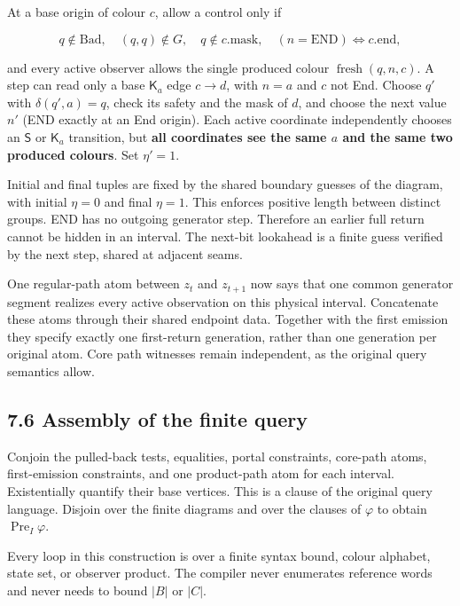 \documentclass[
  11pt,
  a4paper,
]{article}
\begin{document}
At a base origin of colour \(c\), allow a control only if

\[q\notin\mathrm{Bad},\quad(q,q)\notin G,\quad q\notin c.\mathrm{mask},
\quad(n=\mathrm{END})\Longleftrightarrow c.\mathrm{end},\]

and every active observer allows the single produced colour
\(\operatorname{fresh}(q,n,c)\). A step can read only a base
\(\mathsf K_a\) edge \(c\to d\), with \(n=a\) and \(c\) not End. Choose
\(q'\) with \(\delta(q',a)=q\), check its safety and the mask of \(d\),
and choose the next value \(n'\) (END exactly at an End origin). Each
active coordinate independently chooses an \(\mathsf S\) or
\(\mathsf K_a\) transition, but \textbf{all coordinates see the same
\(a\) and the same two produced colours}. Set \(\eta'=1\).

Initial and final tuples are fixed by the shared boundary guesses of the
diagram, with initial \(\eta=0\) and final \(\eta=1\). This enforces
positive length between distinct groups. END has no outgoing generator
step. Therefore an earlier full return cannot be hidden in an interval.
The next-bit lookahead is a finite guess verified by the next step,
shared at adjacent seams.

One regular-path atom between \(z_t\) and \(z_{t+1}\) now says that one
common generator segment realizes every active observation on this
physical interval. Concatenate these atoms through their shared endpoint
data. Together with the first emission they specify exactly one
first-return generation, rather than one generation per original atom.
Core path witnesses remain independent, as the original query semantics
allow.

\subsection{7.6 Assembly of the finite
query}\label{assembly-of-the-finite-query}

Conjoin the pulled-back tests, equalities, portal constraints, core-path
atoms, first-emission constraints, and one product-path atom for each
interval. Existentially quantify their base vertices. This is a clause
of the original query language. Disjoin over the finite diagrams and
over the clauses of \(\varphi\) to obtain
\(\operatorname{Pre}_I\varphi\).

Every loop in this construction is over a finite syntax bound, colour
alphabet, state set, or observer product. The compiler never enumerates
reference words and never needs to bound \(|B|\) or \(|C|\).
\end{document}
